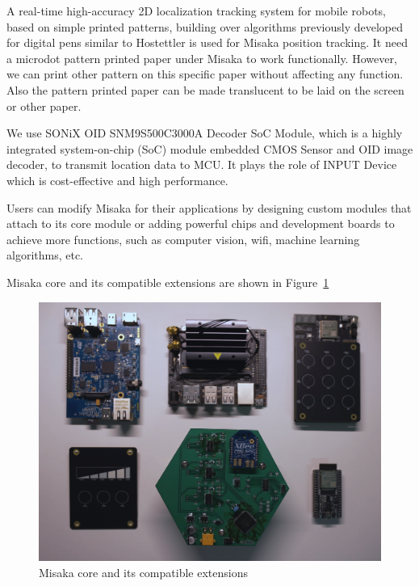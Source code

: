 \documentclass[conference]{IEEEtran}
\begin{document}

A real-time high-accuracy 2D localization tracking system for mobile robots, based on simple printed patterns, building over algorithms previously developed for digital pens similar to Hostettler\cite{hostettler2016real} is used
for Misaka position tracking. It need a microdot pattern printed paper under Misaka to work functionally. However, we can print other pattern on this specific paper without affecting any function. Also the pattern printed paper can be made translucent to be laid on the screen or other paper.

We use SONiX OID SNM9S500C3000A Decoder SoC Module, which is a highly integrated system-on-chip (SoC) module embedded CMOS Sensor and OID image decoder, to transmit location data to MCU. It plays the role of INPUT Device which is cost-effective and high performance.




Users can modify Misaka for their applications by designing custom modules that attach to its core module or adding powerful chips and development boards to achieve more functions, such as computer vision, wifi, machine learning algorithms, etc.

Misaka core and its compatible extensions are shown in Figure~\ref{fig:extension}

\begin{figure}[htbp]
    \centering
    \includegraphics[width=0.8\columnwidth]{extensions.jpg}
    \caption{Misaka core and its compatible extensions}
    \label{fig:extension}
\end{figure}
\end{document}
